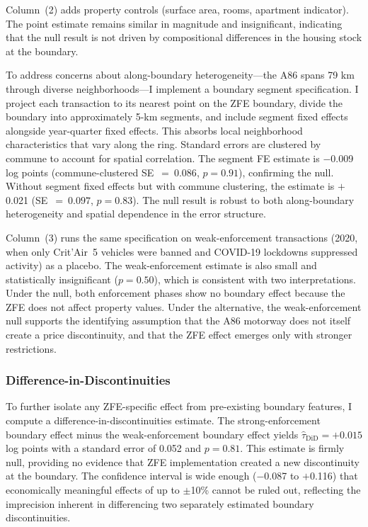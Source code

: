 \documentclass[12pt]{article}
\begin{document}
Column~(2) adds property controls (surface area, rooms, apartment indicator). The point estimate remains similar in magnitude and insignificant, indicating that the null result is not driven by compositional differences in the housing stock at the boundary.

To address concerns about along-boundary heterogeneity---the A86 spans 79 km through diverse neighborhoods---I implement a boundary segment specification. I project each transaction to its nearest point on the ZFE boundary, divide the boundary into approximately 5-km segments, and include segment fixed effects alongside year-quarter fixed effects. This absorbs local neighborhood characteristics that vary along the ring. Standard errors are clustered by commune to account for spatial correlation. The segment FE estimate is $-$0.009 log points (commune-clustered SE~$=~0.086$, $p = 0.91$), confirming the null. Without segment fixed effects but with commune clustering, the estimate is $+$0.021 (SE~$=~0.097$, $p = 0.83$). The null result is robust to both along-boundary heterogeneity and spatial dependence in the error structure.

Column~(3) runs the same specification on weak-enforcement transactions (2020, when only Crit'Air~5 vehicles were banned and COVID-19 lockdowns suppressed activity) as a placebo. The weak-enforcement estimate is also small and statistically insignificant ($p = 0.50$), which is consistent with two interpretations. Under the null, both enforcement phases show no boundary effect because the ZFE does not affect property values. Under the alternative, the weak-enforcement null supports the identifying assumption that the A86 motorway does not itself create a price discontinuity, and that the ZFE effect emerges only with stronger restrictions.

\subsubsection{Difference-in-Discontinuities}

To further isolate any ZFE-specific effect from pre-existing boundary features, I compute a difference-in-discontinuities estimate. The strong-enforcement boundary effect minus the weak-enforcement boundary effect yields $\hat{\tau}_{\text{DiD}} = +0.015$ log points with a standard error of 0.052 and $p = 0.81$. This estimate is firmly null, providing no evidence that ZFE implementation created a new discontinuity at the boundary. The confidence interval is wide enough ($-$0.087 to $+$0.116) that economically meaningful effects of up to $\pm$10\% cannot be ruled out, reflecting the imprecision inherent in differencing two separately estimated boundary discontinuities.
\end{document}
